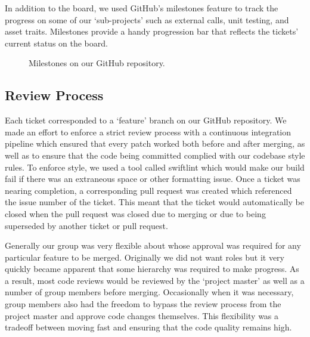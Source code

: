 In addition to the board, we used GitHub's milestones feature to track the progress on some of our `sub-projects' such as external calls, unit testing, and asset traits. Milestones provide a handy progression bar that reflects the tickets' current status on the board.

\begin{figure}[H]
\centering
{}
\caption{Milestones on our GitHub repository.}
\label{milestones}
\end{figure}

\subsection{Review Process}

Each ticket corresponded to a `feature' branch on our GitHub repository. We made an effort to enforce a strict review process with a continuous integration pipeline which ensured that every patch worked both before and after merging, as well as to ensure that the code being committed complied with our codebase style rules. To enforce style, we used a tool called swiftlint which would make our build fail if there was an extraneous space or other formatting issue. Once a ticket was nearing completion, a corresponding pull request was created which referenced the issue number of the ticket. This meant that the ticket would automatically be closed when the pull request was closed due to merging or due to being superseded by another ticket or pull request.

Generally our group was very flexible about whose approval was required for any particular feature to be merged. Originally we did not want roles but it very quickly became apparent that some hierarchy was required to make progress. As a result, most code reviews would be reviewed by the `project master' as well as a number of group members before merging. Occasionally when it was necessary, group members also had the freedom to bypass the review process from the project master and approve code changes themselves. This flexibility was a tradeoff between moving fast and ensuring that the code quality remains high.

